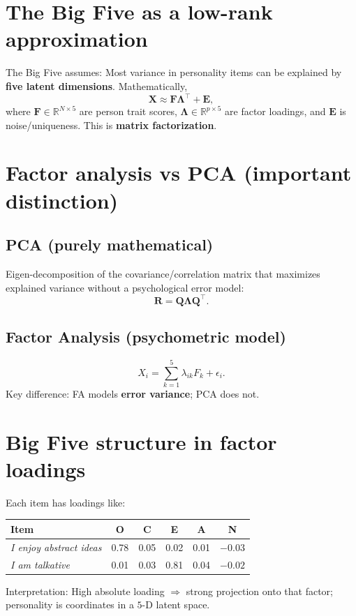 \documentclass[11pt]{article}
\begin{document}
\section{The Big Five as a low-rank approximation}
The Big Five assumes: Most variance in personality items can be explained by \textbf{five latent dimensions}. Mathematically,
\begin{equation}
\mathbf{X} \approx \mathbf{F} \mathbf{\Lambda}^{\top} + \mathbf{E},
\end{equation}
where $\mathbf{F} \in \mathbb{R}^{N\times 5}$ are person trait scores, $\mathbf{\Lambda} \in \mathbb{R}^{p\times 5}$ are factor loadings, and $\mathbf{E}$ is noise/uniqueness. This is \textbf{matrix factorization}.

\section{Factor analysis vs PCA (important distinction)}
\subsection*{PCA (purely mathematical)}
Eigen-decomposition of the covariance/correlation matrix that maximizes explained variance without a psychological error model:
\begin{equation}
\mathbf{R} = \mathbf{Q} \mathbf{\Lambda} \mathbf{Q}^{\top}.
\end{equation}
\subsection*{Factor Analysis (psychometric model)}
\begin{equation}
X_i = \sum_{k=1}^{5} \lambda_{ik} F_k + \epsilon_i.
\end{equation}
Key difference: FA models \textbf{error variance}; PCA does not.

\section{Big Five structure in factor loadings}
Each item has loadings like:
\begin{center}
\begin{tabular}{lccccc}
\toprule
Item & O & C & E & A & N \\
\midrule
\emph{I enjoy abstract ideas} & 0.78 & 0.05 & 0.02 & 0.01 & $-0.03$ \\
\emph{I am talkative} & 0.01 & 0.03 & 0.81 & 0.04 & $-0.02$ \\
\bottomrule
\end{tabular}
\end{center}
Interpretation: High absolute loading $\Rightarrow$ strong projection onto that factor; personality is coordinates in a $5$-D latent space.
\end{document}
